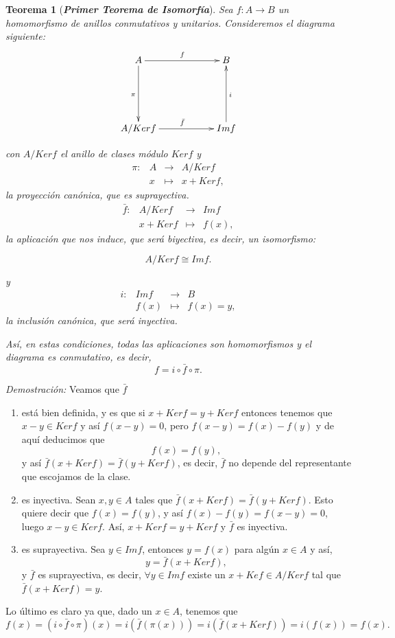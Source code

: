 \documentclass[12pt]{article}
\newtheorem{theorem}{Teorema}[section]
\begin{document}
\begin{theorem}[\textbf{\textit{Primer Teorema de Isomorfía}}]\label{eq:1ti} Sea $f \colon A \longrightarrow B$ un homomorfismo de anillos conmutativos y unitarios. Consideremos el diagrama siguiente:
$$\xymatrix @=2cm {A\ar[r]^{f} \ar[d]_\pi & B  \\ A/Ker f \ar[r]^{\bar{f}} & Im f \ar[u]_{i}  }$$

con $A/Ker f$ el anillo de clases módulo $Ker f$ y $$\begin{array}{rccl}
\pi \colon &A&\longrightarrow &A/Ker f \\
&x& \longmapsto &x + Ker f,
\end{array}
$$ 
la proyección canónica, que es suprayectiva.
$$\begin{array}{rccl}
\bar{f} \colon &A/Ker f&\longrightarrow &Im f \\
&x + Ker f& \longmapsto &f(x),
\end{array}
$$ 
la aplicación que nos induce, que será biyectiva, es decir, un isomorfismo: 

$$A/Ker f \cong Imf.$$

y
$$\begin{array}{rccl}
i \colon &Im f&\longrightarrow &B \\
&f(x)& \longmapsto &f(x) =y,
\end{array}
$$ 
la inclusión canónica, que será inyectiva. 

Así, en estas condiciones, todas las aplicaciones son homomorfismos y el diagrama es conmutativo, es decir, $$f = i \circ \bar{f} \circ \pi.$$
\end{theorem}
\emph{Demostración: }Veamos que $\bar{f}$ \begin{enumerate}
\item está bien definida, y es que si $x + Ker f = y + Ker f$ entonces tenemos que $x-y \in Ker f$ y así $f(x-y) = 0$, pero $f(x-y)= f(x) -f(y)$ y de aquí deducimos que $$f(x) = f(y),$$ y así $\bar{f}(x + Kerf) = \bar{f}(y+ Kerf)$, es decir, $\bar{f}$ no depende del representante que escojamos de la clase.
\item es inyectiva. Sean $x,y \in A$ tales que $\bar{f}(x + Kerf) = \bar{f}(y + Kerf)$. Esto quiere decir que $f(x) = f(y)$, y así $f(x) - f(y) = f(x-y) = 0$, luego $x-y \in Kerf$. Así, $x + Kerf = y + Kerf$ y $\bar{f}$ es inyectiva.
\item es suprayectiva. Sea $y \in Imf$, entonces $y = f(x)$ para algún $x \in A$ y así, $$y = \bar{f}(x + Kerf),$$ y $\bar{f}$ es suprayectiva, es decir, $\forall y \in Imf$ existe un $x + Kef \in A/Kerf$ tal que $\bar{f}(x + Kerf) = y$.
\end{enumerate}
Lo último es claro ya que, dado un $x \in A$, tenemos que $$f(x) = (i \circ \bar{f} \circ \pi) (x) = i(\bar{f}(\pi(x))) = i(\bar{f}(x + Kerf)) = i(f(x)) = f(x).$$
\end{document}
